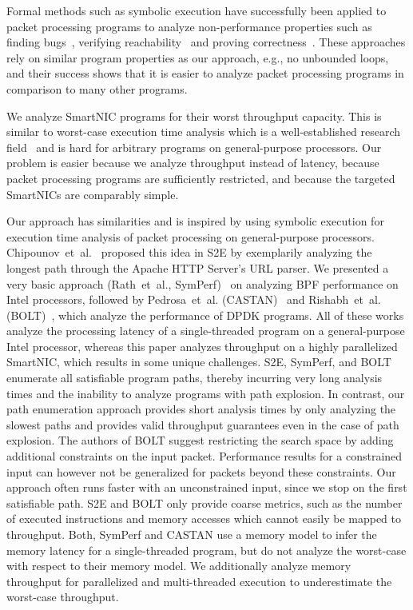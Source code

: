 \documentclass[sigconf,screen,authordraft]{acmart}
\makeatletter
\newcommand{\eg}{e.g.,}
\newcommand{\etal}{et~al.\@}
\newcommand{\afblock}[1]{\noindent{\textbf{#1.}}}
\makeatother
\begin{document}
\afblock{Non-Performance Program Analysis}
Formal methods such as symbolic execution have successfully been applied to packet processing programs to analyze non-performance properties such as finding bugs~\cite{vera,p4pktgen,software-dataplane-verification,gauntlet}, verifying reachability~\cite{symnet,software-dataplane-verification} and proving correctness~\cite{vigor,assert-p4,netdiff,jitterbug}.
These approaches rely on similar program properties as our approach, \eg{} no unbounded loops, and their success shows that it is easier to analyze packet processing programs in comparison to many other programs.

\afblock{Performance Analysis}
We analyze SmartNIC programs for their worst throughput capacity.
This is similar to worst-case execution time analysis which is a well-established research field~\cite{wcet} and is hard for arbitrary programs on general-purpose processors.
Our problem is easier because we analyze throughput instead of latency, because packet processing programs are sufficiently restricted, and because the targeted SmartNICs are comparably simple.

Our approach has similarities and is inspired by using symbolic execution for execution time analysis of packet processing on general-purpose processors.
Chipounov~\etal{}~\cite{s2e} proposed this idea in S2E by exemplarily analyzing the longest path through the Apache HTTP Server's URL parser.
We presented a very basic approach (Rath~\etal{}, SymPerf)~\cite{symperf} on analyzing BPF performance on Intel processors, followed by Pedrosa~\etal{} (CASTAN)~\cite{castan} and Rishabh~\etal{} (BOLT)~\cite{BOLT}, which analyze the performance of DPDK programs.
All of these works analyze the processing latency of a single-threaded program on a general-purpose Intel processor, whereas this paper analyzes throughput on a highly parallelized SmartNIC, which results in some unique challenges.
S2E, SymPerf, and BOLT enumerate all satisfiable program paths, thereby incurring very long analysis times and the inability to analyze programs with path explosion.
In contrast, our path enumeration approach provides short analysis times by only analyzing the slowest paths and provides valid throughput guarantees even in the case of path explosion.
The authors of BOLT suggest restricting the search space by adding additional constraints on the input packet.
Performance results for a constrained input can however not be generalized for packets beyond these constraints.
Our approach often runs faster with an unconstrained input, since we stop on the first satisfiable path.
S2E and BOLT only provide coarse metrics, such as the number of executed instructions and memory accesses which cannot easily be mapped to throughput.
Both, SymPerf and CASTAN use a memory model to infer the memory latency for a single-threaded program, but do not analyze the worst-case with respect to their memory model.
We additionally analyze memory throughput for parallelized and multi-threaded execution to underestimate the worst-case throughput.
\end{document}
